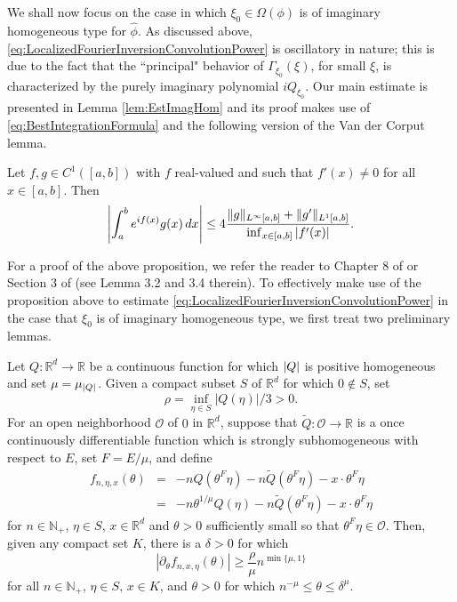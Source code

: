 \documentclass[smallextended]{svjour3}
\theoremstyle{remark}
\begin{document}
\noindent We shall now focus on the case in which $\xi_0\in\Omega(\phi)$ is of imaginary homogeneous type for $\widehat{\phi}$. As discussed above,  \eqref{eq:LocalizedFourierInversionConvolutionPower} is oscillatory in nature; this is due to the fact that the ``principal" behavior of $\Gamma_{\xi_0}(\xi)$, for small $\xi$, is characterized by the purely imaginary polynomial $iQ_{\xi_0}$. Our main estimate is presented in Lemma \ref{lem:EstImagHom} and its proof makes use of \eqref{eq:BestIntegrationFormula} and the following version of the Van der Corput lemma.

\begin{proposition}\label{prop:VanderCorput}
Let $f,g\in C^1([a,b])$ with $f$ real-valued and such that $f'(x)\neq 0$ for all $x\in [a,b]$. Then
\begin{equation*}
\abs{\int_a^b e^{if(x)}g(x)\,dx}\leq 4\frac{\|g\|_{L^\infty[a,b]}+\|g'\|_{L^1[a,b]}}{\inf_{x\in[a,b]}\abs{f'(x)}}.
\end{equation*}
\end{proposition}

\noindent For a proof of the above proposition, we refer the reader to Chapter 8 of \cite{stein_harmonic_1993} or Section 3 of \cite{randles_convolution_2015} (see Lemma 3.2 and 3.4 therein).  To effectively make use of the proposition above to estimate \eqref{eq:LocalizedFourierInversionConvolutionPower} in the case that $\xi_0$ is of imaginary homogeneous type, we first treat two preliminary lemmas. 

\begin{lemma}\label{lem:PhaseDerivativeEstimate}
Let $Q:\mathbb{R}^d\to\mathbb{R}$ be a continuous function for which $\abs{Q}$ is positive homogeneous and set $\mu=\mu_{\abs{Q}}$. Given a compact subset $S$ of $\mathbb{R}^d$ for which $0\notin S$, set
\begin{equation*}
    \rho=\inf_{\eta\in S}|Q(\eta)|/3>0.
\end{equation*}
For an open neighborhood $\mathcal{O}$ of $0$ in $\mathbb{R}^d$, suppose that $\widetilde{Q}:\mathcal{O}\to\mathbb{R}$ is a once continuously differentiable function which is strongly subhomogeneous with respect to $E$, set $F=E/\mu$, and define
\begin{eqnarray*}
f_{n,\eta,x}(\theta)&=&-nQ(\theta^F\eta)-n\widetilde{Q}(\theta^F\eta)-x\cdot \theta^F\eta\\
&=&-n\theta^{1/\mu}Q(\eta)-n\widetilde{Q}(\theta^{F}\eta)-x\cdot \theta^{F}\eta
\end{eqnarray*}
for $n\in\mathbb{N}_+$, $\eta\in S$, $x\in\mathbb{R}^d$ and $\theta>0$ sufficiently small so that $\theta^F\eta\in\mathcal{O}$. Then, given any compact set $K$, there is a $\delta>0$ for which
\begin{equation*}
    |\partial_\theta f_{n,x,\eta}(\theta)|\geq \frac{\rho}{\mu} n^{\min\{\mu,1\}}
\end{equation*}
for all $n\in\mathbb{N}_+$, $\eta\in S$,  $x\in K$, and $\theta>0$ for which $n^{-\mu}\leq \theta\leq \delta^\mu$.
\end{lemma}
\end{document}
